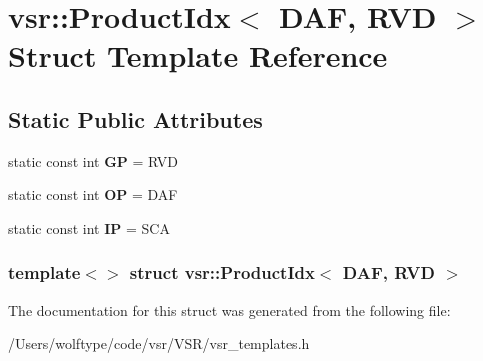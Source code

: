 \hypertarget{structvsr_1_1_product_idx_3_01_d_a_f_00_01_r_v_d_01_4}{\section{vsr\-:\-:Product\-Idx$<$ D\-A\-F, R\-V\-D $>$ Struct Template Reference}
\label{structvsr_1_1_product_idx_3_01_d_a_f_00_01_r_v_d_01_4}
}
\subsection*{Static Public Attributes}
\begin{DoxyCompactItemize}
\item 
\hypertarget{structvsr_1_1_product_idx_3_01_d_a_f_00_01_r_v_d_01_4_a59a585bb149cfe5e7558e218e7d47e34}{static const int {\bfseries G\-P} = R\-V\-D}\label{structvsr_1_1_product_idx_3_01_d_a_f_00_01_r_v_d_01_4_a59a585bb149cfe5e7558e218e7d47e34}

\item 
\hypertarget{structvsr_1_1_product_idx_3_01_d_a_f_00_01_r_v_d_01_4_af172917d7aa66132ecc2d7864bce9cfb}{static const int {\bfseries O\-P} = D\-A\-F}\label{structvsr_1_1_product_idx_3_01_d_a_f_00_01_r_v_d_01_4_af172917d7aa66132ecc2d7864bce9cfb}

\item 
\hypertarget{structvsr_1_1_product_idx_3_01_d_a_f_00_01_r_v_d_01_4_a1806c0fd4a22d07f097720c1d7bf980d}{static const int {\bfseries I\-P} = S\-C\-A}\label{structvsr_1_1_product_idx_3_01_d_a_f_00_01_r_v_d_01_4_a1806c0fd4a22d07f097720c1d7bf980d}

\end{DoxyCompactItemize}
\subsubsection*{template$<$$>$ struct vsr\-::\-Product\-Idx$<$ D\-A\-F, R\-V\-D $>$}



The documentation for this struct was generated from the following file\-:\begin{DoxyCompactItemize}
\item 
/\-Users/wolftype/code/vsr/\-V\-S\-R/vsr\-\_\-templates.\-h\end{DoxyCompactItemize}
